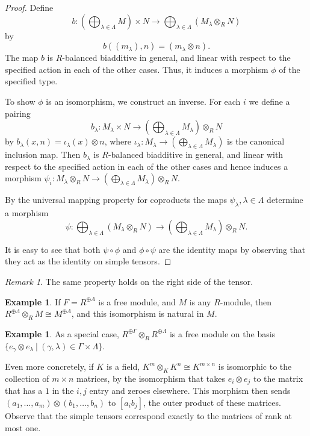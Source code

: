 \documentclass{amsart}[12pt]
\numberwithin{equation}{section}
\theoremstyle{plain} %
\theoremstyle{definition}
\newtheorem{ex}[equation]{Example}
\theoremstyle{remark}
\newtheorem{rem}[equation]{Remark}
\begin{document}
\begin{proof} Define 
$$
b: \left(\bigoplus_{\lambda\in\Lambda} M\right) \times N\to \bigoplus_{\lambda\in\Lambda}  \left(M_\lambda \otimes_R N\right)
$$
by 
$$
b((m_\lambda) , n) = (m_\lambda \otimes n).
$$
The map $b$ is $R$-balanced biadditive in general, and linear with respect to the specified action in each of the other cases. Thus, it induces a morphism $\phi$ of the specified type.

To show $\phi$  is an isomorphism, we construct an inverse. 
For each $i$ we define a pairing
$$
b_\lambda: M_\lambda \times N \to \left(\bigoplus_{\lambda\in\Lambda} M_\lambda \right) \otimes_R N 
$$
by $b_\lambda(x, n) = \iota_\lambda(x) \otimes n$, where $\iota_\lambda: M_\lambda \to \left( \bigoplus_{\lambda\in\Lambda} M_\lambda \right)$ is the canonical inclusion map.
Then $b_\lambda$ is $R$-balanced biadditive in general, and linear with respect to the specified action in each of the other cases and hence induces a morphism
$\psi_i:  M_\lambda \otimes_R N \to \left(\bigoplus_{\lambda \in \Lambda} M_\lambda \right) \otimes_R N$.

By the universal mapping property for coproducts the maps $\psi_\lambda, \lambda\in \Lambda$ 
determine a morphism 
$$
\psi:  \bigoplus_{\lambda\in\Lambda} (M_\lambda \otimes_R N) \to \left(\bigoplus_{\lambda \in \Lambda} M_\lambda \right) \otimes_R N.
$$

It is easy to see that both $\psi \circ \phi$ and $\phi \circ \psi$ are the identity maps by observing that they act as the identity on simple tensors.
\end{proof}

\begin{rem} The same property holds on the right side of the tensor.
\end{rem}

\begin{ex} If $F=R^{\oplus \Lambda}$ is a free module, and $M$ is any $R$-module, then $R^{\oplus \Lambda} \otimes_R M \cong M^{\oplus \Lambda}$, and this isomorphism is natural in $M$.
\end{ex}

\begin{ex} As a special case, $R^{\oplus \Gamma} \otimes_R R^{\oplus \Lambda}$ is a free module on the basis $\{e_\gamma \otimes e_\lambda \ | \ (\gamma,\lambda)\in \Gamma\times\Lambda\}$. 

Even more concretely, if $K$ is a field, $K^m \otimes_K K^n \cong K^{m\times n}$ is isomorphic to the collection of $m\times n$ matrices, by the isomorphism that takes $e_i\otimes e_j$ to the matrix that has a $1$ in the $i,j$ entry and zeroes elsewhere. This morphism then sends $(a_1,\dots,a_m)\otimes (b_1,\dots,b_n)$ to $[a_i b_j]$, the outer product of these matrices. Observe that the simple tensors correspond exactly to the matrices of rank at most one.
\end{ex}
\end{document}
